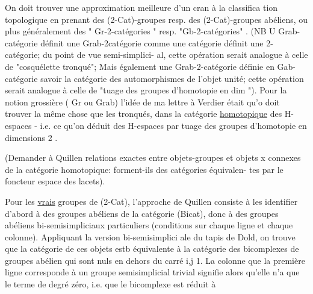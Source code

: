 On doit trouver une approximation meilleure d'un cran à la classifica
tion topologique en prenant des  (2-Cat)-groupes resp. des (2-Cat)-groupes
abéliens,  ou plus généralement des " Gr-2-catégories "  resp.
"Gb-2-catégories" . (NB  U Grab-catégorie définit une Grab-2catégorie
comme une catégorie définit une 2-catégorie; du point de vue semi-simplici-%
al, cette opération serait analogue à celle de "cosquélette tronqué";
Mais également une Grab-2-catégorie définie en Gab-catégorie\xout{\unsure{,}} savoir la
catégorie des automorphismes de l'objet unité; cette  opération serait
analogue à celle de "tuage des groupes d'homotopie en dim \hand{$>$}").  Pour la
notion grossière ( Gr ou Grab) l'idée de ma lettre à Verdier était qu'o
doit trouver la même chose que les tronqués, dans la catégorie \uline{homotopique}
des H-espaces  -  i.e. ce qu'on déduit des H-espaces par tuage des groupes
d'homotopie en dimensions \hand{$>$}2 .

\margin{$\|$} (Demander à Quillen relations exactes entre objets-groupes et objets
x connexes de la catégorie homotopique: forment-ils des catégories équivalen-%
tes par le foncteur espace des lacets).

Pour les \uline{vrais} groupes de (2-Cat), l'approche de Quillen consiste à
les identifier d'abord à des groupes abéliens de la catégorie (Bicat),
donc à des groupes abéliens bi-semisimpliciaux particuliers (conditions
sur chaque ligne et chaque colonne). Appliquant la version bi-semisimplici
ale du tapis de Dold, on trouve que  la catégorie de ces objets
estb équivalente à la catégorie des  bicomplexes  de groupes  abélien
qui sont nuls en dehors du carré  \hand{$\leq$}i,j \hand{$\leq$} 1.   La colonne
que la première ligne corresponde à un  groupe semisimplicial
trivial signifie alors qu'elle n'a que le terme de degré zéro, i.e. que
le bicomplexe est réduit à


